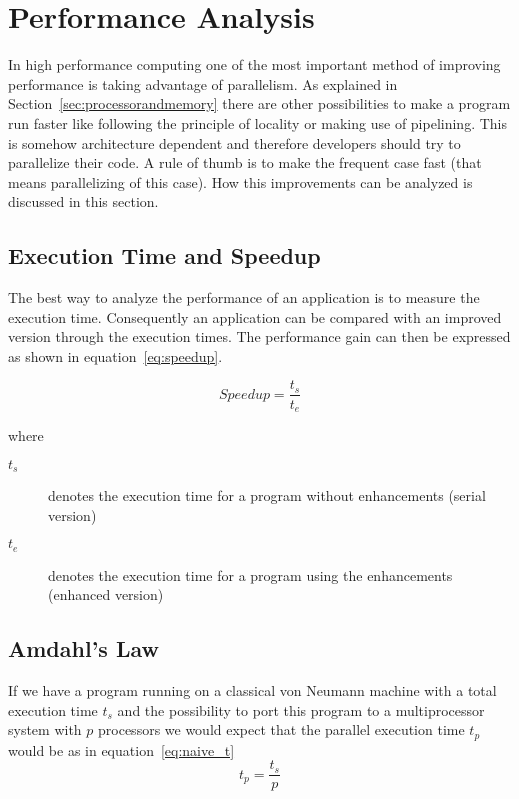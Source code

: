 
\section{Performance Analysis}
\label{sec:perf_analysis}

In high performance computing one of the most important method of
improving performance is taking advantage of parallelism. As explained
in Section~\ref{sec:processorandmemory} there are other possibilities
to make a program run faster like following the principle of locality
or making use of pipelining. This is somehow architecture
dependent and therefore developers should try to parallelize their
code. A rule of thumb is to make the frequent case fast (that means
parallelizing of this case). How this improvements can be analyzed is
discussed in this section.

\subsection{Execution Time and Speedup}

The best way to analyze the performance of an application is to
measure the execution time. Consequently an application can be compared
with an improved version through the execution times.
The performance gain can then be expressed as shown in
equation~\ref{eq:speedup}. 

\begin{equation}
\label{eq:speedup}
Speedup = \frac{t_s}{t_e}
\end{equation}

where
\begin{description}
\item[$t_s$] denotes the execution time for a program without
  enhancements (serial version)
\item[$t_e$] denotes the execution time for a program using the
  enhancements (enhanced version)
\end{description}

\subsection{Amdahl's Law}

If we have a program running on a classical von Neumann machine with a
total execution time $t_s$ and the possibility to port this program to
a multiprocessor system with $p$ processors we would expect that the
parallel execution time $t_p$ would be as in equation~\ref{eq:naive_t}
\begin{equation}
\label{eq:naive_t}
t_p = \frac{t_s}{p}
\end{equation}

